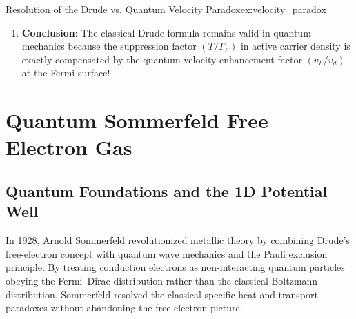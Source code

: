 \documentclass[11pt,a4paper]{article}
\begin{document}
\begin{examplebox}{Resolution of the Drude vs. Quantum Velocity Paradox}{ex:velocity_paradox}
\begin{enumerate}[leftmargin=*]
    The volume of uncompensated momentum states produced at the Fermi surface when integrated over the spherical boundary yields an effective charge displacement proportional to $k_F^3 \propto n$. As derived rigorously via the Boltzmann Transport Equation in Chapter~5:
    \[
    j_{\mathrm{quantum}} = \frac{e^2 \tau E}{12\pi^3 \hbar} v_F (4\pi k_F^2) = \frac{e^2 \tau k_F^3}{3\pi^2 m} E
    \]
    Using $k_F^3 = 3\pi^2 n$, this simplifies exactly to:
    \[
    j_{\mathrm{quantum}} = \left(\frac{n e^2 \tau}{m}\right)E \implies \sigma = \frac{n e^2 \tau}{m}
    \]
    \item \textbf{Conclusion}: The classical Drude formula remains valid in quantum mechanics because the suppression factor $(T/T_F)$ in active carrier density is exactly compensated by the quantum velocity enhancement factor $(v_F/v_d)$ at the Fermi surface!
\end{enumerate}
\end{examplebox}

\clearpage


\section{Quantum Sommerfeld Free Electron Gas}
\label{sec:sommerfeld_model}

\subsection{Quantum Foundations and the 1D Potential Well}
In 1928, Arnold Sommerfeld revolutionized metallic theory by combining Drude's free-electron concept with quantum wave mechanics and the Pauli exclusion principle. By treating conduction electrons as non-interacting quantum particles obeying the Fermi--Dirac distribution rather than the classical Boltzmann distribution, Sommerfeld resolved the classical specific heat and transport paradoxes without abandoning the free-electron picture.
\end{document}

